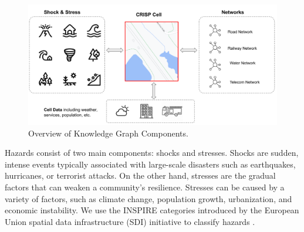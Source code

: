 \documentclass[
]{ceurart}
\begin{document}
\begin{figure}
  \label{overview}
  \centering
  \includegraphics[scale=0.25]{images/Crisp_Overview}
  \caption{Overview of Knowledge Graph Components.}
\end{figure}


Hazards consist of two main components: shocks and stresses. Shocks are sudden, intense events typically associated with large-scale disasters such as earthquakes, hurricanes, or terrorist attacks. On the other hand, stresses are the gradual factors that can weaken a community's resilience. Stresses can be caused by a variety of factors, such as climate change, population growth, urbanization, and economic instability. We use the INSPIRE categories introduced by the European Union spatial data infrastructure (SDI) initiative to classify hazards \cite{bartha2011standardization}. 
\end{document}
